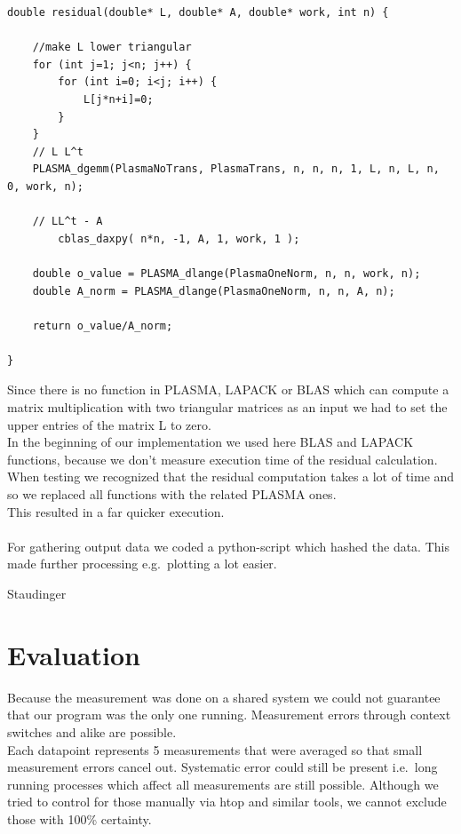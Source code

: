 \documentclass[a4paper,final,ngerman,english]{article}
\begin{document}
\begin{lstlisting}
double residual(double* L, double* A, double* work, int n) {

	//make L lower triangular
	for (int j=1; j<n; j++) {
		for (int i=0; i<j; i++) {
			L[j*n+i]=0;
		}
	}
	// L L^t
	PLASMA_dgemm(PlasmaNoTrans, PlasmaTrans, n, n, n, 1, L, n, L, n, 0, work, n);

	// LL^t - A
    	cblas_daxpy( n*n, -1, A, 1, work, 1 );

	double o_value = PLASMA_dlange(PlasmaOneNorm, n, n, work, n);
	double A_norm = PLASMA_dlange(PlasmaOneNorm, n, n, A, n);

	return o_value/A_norm;

}
\end{lstlisting}
Since there is no function in PLASMA, LAPACK or BLAS which can compute a matrix multiplication with two triangular matrices as an input we had to set the upper entries of the matrix L to zero.\\
In the beginning of our implementation we used here BLAS and LAPACK functions, because we don't measure execution time of the residual calculation. When testing we recognized that the residual computation takes a lot of time and so we replaced all functions with the related PLASMA ones.\\
This resulted in a far quicker execution.\\
\ \\
For gathering output data we coded a python-script which hashed the data. This made further processing e.g.\ plotting a lot easier.
\begin{flushright} Staudinger \end{flushright}

\section{Evaluation}
Because the measurement was done on a shared system
we could not guarantee that our program was the only one running.
Measurement errors through context switches and alike are possible.\\
Each datapoint represents 5 measurements that were averaged so that small measurement errors cancel out.
Systematic error could still be present i.e.\ long running processes which affect all measurements
are still possible. Although we tried to control for those manually via htop and similar tools, we cannot exclude
those with 100\% certainty.
\end{document}

